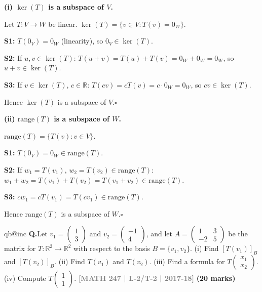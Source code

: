 \documentclass[12pt,a3paper]{article}
\makeatletter
\newcommand{\yr}[1]{\hfill\textcolor{gray}{\small\textbf{[#1]}}}
\newcommand{\mk}[1]{\textcolor{orange!70!black}{\small\textbf{(#1 marks)}}}
\newcounter{qnum}
\newcommand{\Q}[1]{%
  \csname qb@inc\endcsname
  \needspace{4\baselineskip}
  \refstepcounter{qnum}
  \vspace{6pt}
  \noindent\textbf{Q\theqnum.}\enspace #1\par
}
\makeatother
\begin{document}
\begin{tcolorbox}[enhanced,breakable,colback=cF!4,colframe=cF,
  boxrule=0.8pt,arc=5pt,
  title={\textbf{Answer --- Kernel and Range of $T$ are Subspaces}},
  fonttitle=\bfseries\color{white},colbacktitle=cF]

\textbf{(i) $\ker(T)$ is a subspace of $V$.}

Let $T:V\to W$ be linear. $\ker(T)=\{v\in V: T(v)=0_W\}$.

\textbf{S1:} $T(0_V)=0_W$ (linearity), so $0_V\in\ker(T)$.\;\checkmark

\textbf{S2:} If $u,v\in\ker(T)$: $T(u+v)=T(u)+T(v)=0_W+0_W=0_W$, so $u+v\in\ker(T)$.\;\checkmark

\textbf{S3:} If $v\in\ker(T)$, $c\in\mathbb{R}$: $T(cv)=cT(v)=c\cdot0_W=0_W$, so $cv\in\ker(T)$.\;\checkmark

Hence $\ker(T)$ is a subspace of $V$.\hfill$\square$

\medskip
\textbf{(ii) $\mathrm{range}(T)$ is a subspace of $W$.}

$\mathrm{range}(T)=\{T(v):v\in V\}$.

\textbf{S1:} $T(0_V)=0_W\in\mathrm{range}(T)$.\;\checkmark

\textbf{S2:} If $w_1=T(v_1),\,w_2=T(v_2)\in\mathrm{range}(T)$: $w_1+w_2=T(v_1)+T(v_2)=T(v_1+v_2)\in\mathrm{range}(T)$.\;\checkmark

\textbf{S3:} $cw_1=cT(v_1)=T(cv_1)\in\mathrm{range}(T)$.\;\checkmark

Hence $\mathrm{range}(T)$ is a subspace of $W$.\hfill$\square$

\end{tcolorbox}

\Q{Let $v_1 = \begin{pmatrix} 1 \\ 3 \end{pmatrix}$ and $v_2 = \begin{pmatrix} -1 \\ 4 \end{pmatrix}$, and let $A = \begin{pmatrix} 1 & 3 \\ -2 & 5 \end{pmatrix}$ be the matrix for $T: \mathbb{R}^2 \to \mathbb{R}^2$ with respect to the basis $B = \{v_1, v_2\}$. (i) Find $[T(v_1)]_B$ and $[T(v_2)]_B$. (ii) Find $T(v_1)$ and $T(v_2)$. (iii) Find a formula for $T\begin{pmatrix} x_1 \\ x_2 \end{pmatrix}$. (iv) Compute $T\begin{pmatrix} 1 \\ 1 \end{pmatrix}$.
\yr{MATH 247 | L-2/T-2 | 2017-18} \mk{20}}
\end{document}
